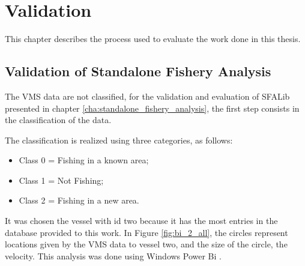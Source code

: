 % 
% 
%
\chapter{Validation}
\label{cha:validation}

This chapter describes the process used to evaluate the work done in this thesis.

\section{Validation of Standalone Fishery Analysis} %
\label{sec:val_SFA}

The VMS data are not classified, for the validation and evaluation of SFALib presented in chapter \ref{cha:standalone_fishery_analysis}, the first step consists in the classification of the data.

The classification is realized using three categories, as follows:
\begin{itemize}
\item Class 0 = Fishing in a known area;
\item Class 1 = Not Fishing;
\item Class 2 = Fishing in a new area.
\end{itemize} 


It was chosen the vessel with id two because it has the most entries in the database provided to this work. In Figure \ref{fig:bi_2_all}, the circles represent locations given by the VMS data to vessel two, and the size of the circle, the velocity. This analysis was done using Windows Power Bi \cite{WEBSITE:PowerBi}.

